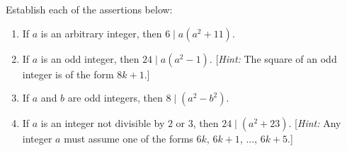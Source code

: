 \begin{exercise}
    Establish each of the assertions below:
    \begin{enumerate}
        \item If $a$ is an arbitrary integer, then $6 \mid a(a^2 + 11)$.
        \item If $a$ is an odd integer, then $24 \mid a(a^2 - 1)$. [\textit{Hint:} The square of an odd integer is of the form $8k+1$.]
        \item If $a$ and $b$ are odd integers, then $8 \mid (a^2 - b^2)$.
        \item If $a$ is an integer not divisible by $2$ or $3$, then $24 \mid (a^2 + 23)$. [\textit{Hint:} Any integer $a$ must assume one of the forms $6k$, $6k+1$, ..., $6k+5$.]
    \end{enumerate}
\end{exercise}

